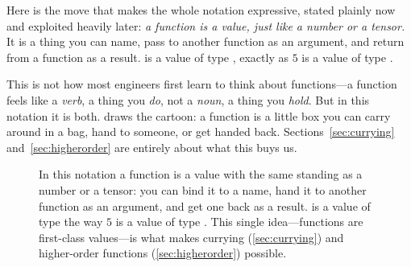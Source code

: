 Here is the move that makes the whole notation expressive, stated plainly now and
exploited heavily later: \emph{a function is a value, just like a number or a
tensor.} It is a thing you can name, pass to another function as an argument, and
return from a function as a result.  is a value of type
, exactly as $5$ is a value of type .

This is not how most engineers first learn to think about functions---a function
feels like a \emph{verb}, a thing you \emph{do}, not a \emph{noun}, a thing you
\emph{hold}. But in this notation it is both.  draws the
cartoon: a function is a little box you can carry around in a bag, hand to
someone, or get handed back. Sections~\ref{sec:currying}
and~\ref{sec:higherorder} are entirely about what this buys us.

\begin{figure}[t]
\centering
{}
\caption[A function is a value you can pass around]{In this notation a function is
a value with the same standing as a number or a tensor: you can bind it to a name,
hand it to another function as an argument, and get one back as a result.
 is a value of type  the way $5$ is a value of
type . This single idea---functions are first-class values---is what
makes currying (\cref{sec:currying}) and higher-order functions
(\cref{sec:higherorder}) possible.}
\label{fig:fnvalue}
\end{figure}

